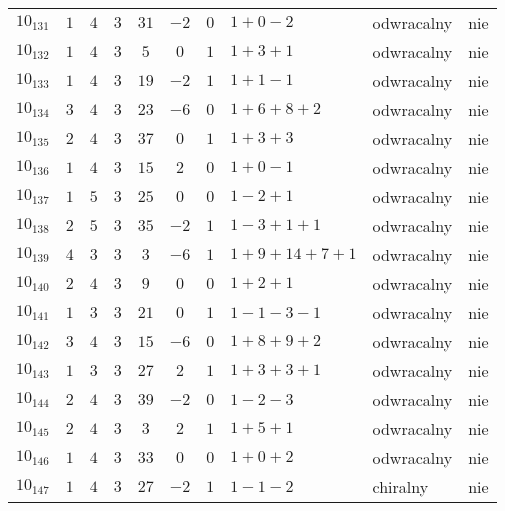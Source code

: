 \begin{longtable}{lccccccllc}
$10_{131}$  &  $1$     &  $4$  &  $3$      &  $31$   &  $-2$  &  $0$  &  $1+0-2$        &  odwracalny  &  nie  \\
$10_{132}$  &  $1$     &  $4$  &  $3$      &  $5$    &  $0$   &  $1$  &  $1+3+1$        &  odwracalny  &  nie  \\
$10_{133}$  &  $1$     &  $4$  &  $3$      &  $19$   &  $-2$  &  $1$  &  $1+1-1$        &  odwracalny  &  nie  \\
$10_{134}$  &  $3$     &  $4$  &  $3$      &  $23$   &  $-6$  &  $0$  &  $1+6+8+2$      &  odwracalny  &  nie  \\
$10_{135}$  &  $2$     &  $4$  &  $3$      &  $37$   &  $0$   &  $1$  &  $1+3+3$        &  odwracalny  &  nie  \\
$10_{136}$  &  $1$     &  $4$  &  $3$      &  $15$   &  $2$   &  $0$  &  $1+0-1$        &  odwracalny  &  nie  \\
$10_{137}$  &  $1$     &  $5$  &  $3$      &  $25$   &  $0$   &  $0$  &  $1-2+1$        &  odwracalny  &  nie  \\
$10_{138}$  &  $2$     &  $5$  &  $3$      &  $35$   &  $-2$  &  $1$  &  $1-3+1+1$      &  odwracalny  &  nie  \\
$10_{139}$  &  $4$     &  $3$  &  $3$      &  $3$    &  $-6$  &  $1$  &  $1+9+14+7+1$   &  odwracalny  &  nie  \\
$10_{140}$  &  $2$     &  $4$  &  $3$      &  $9$    &  $0$   &  $0$  &  $1+2+1$        &  odwracalny  &  nie  \\
$10_{141}$  &  $1$     &  $3$  &  $3$      &  $21$   &  $0$   &  $1$  &  $1-1-3-1$      &  odwracalny  &  nie  \\
$10_{142}$  &  $3$     &  $4$  &  $3$      &  $15$   &  $-6$  &  $0$  &  $1+8+9+2$      &  odwracalny  &  nie  \\
$10_{143}$  &  $1$     &  $3$  &  $3$      &  $27$   &  $2$   &  $1$  &  $1+3+3+1$      &  odwracalny  &  nie  \\
$10_{144}$  &  $2$     &  $4$  &  $3$      &  $39$   &  $-2$  &  $0$  &  $1-2-3$        &  odwracalny  &  nie  \\
$10_{145}$  &  $2$     &  $4$  &  $3$      &  $3$    &  $2$   &  $1$  &  $1+5+1$        &  odwracalny  &  nie  \\
$10_{146}$  &  $1$     &  $4$  &  $3$      &  $33$   &  $0$   &  $0$  &  $1+0+2$        &  odwracalny  &  nie  \\
$10_{147}$  &  $1$     &  $4$  &  $3$      &  $27$   &  $-2$  &  $1$  &  $1-1-2$        &  chiralny    &  nie  \\

\end{longtable}

